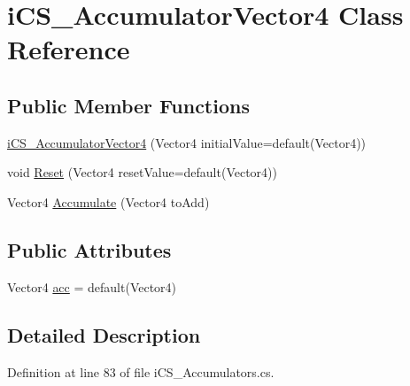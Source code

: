 \hypertarget{classi_c_s___accumulator_vector4}{\section{i\+C\+S\+\_\+\+Accumulator\+Vector4 Class Reference}
\label{classi_c_s___accumulator_vector4}
}
\subsection*{Public Member Functions}
\begin{DoxyCompactItemize}
\item 
\hyperlink{classi_c_s___accumulator_vector4_a559f3ed2688c8e9bc8d5309dd44620fa}{i\+C\+S\+\_\+\+Accumulator\+Vector4} (Vector4 initial\+Value=default(Vector4))
\item 
void \hyperlink{classi_c_s___accumulator_vector4_a2785737de517b3c0f739309e5217dd4d}{Reset} (Vector4 reset\+Value=default(Vector4))
\item 
Vector4 \hyperlink{classi_c_s___accumulator_vector4_a0f8be07a41d8e06c8a88d15c747524ad}{Accumulate} (Vector4 to\+Add)
\end{DoxyCompactItemize}
\subsection*{Public Attributes}
\begin{DoxyCompactItemize}
\item 
Vector4 \hyperlink{classi_c_s___accumulator_vector4_a9f29e0408689d6ca890d395d5494a16a}{acc} = default(Vector4)
\end{DoxyCompactItemize}


\subsection{Detailed Description}


Definition at line 83 of file i\+C\+S\+\_\+\+Accumulators.\+cs.



